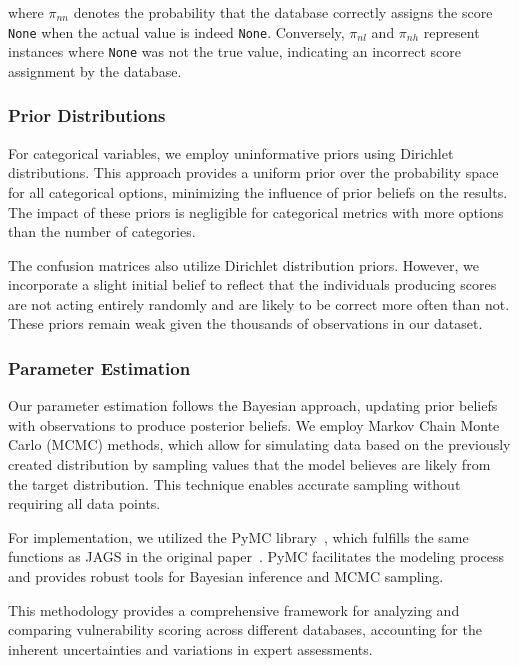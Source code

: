 \documentclass[12pt]{article}
\begin{document}
where $\pi_{nn}$ denotes the probability that the database correctly assigns the score \texttt{None}
when the actual value is indeed \texttt{None}. Conversely, $\pi_{nl}$ and $\pi_{nh}$ represent
instances where \texttt{None} was not the true value, indicating an incorrect score assignment by
the database.

\subsubsection{Prior Distributions}

For categorical variables, we employ uninformative priors using Dirichlet distributions. This
approach provides a uniform prior over the probability space for all categorical options, minimizing
the influence of prior beliefs on the results. The impact of these priors is negligible for
categorical metrics with more options than the number of categories.

The confusion matrices also utilize Dirichlet distribution priors. However, we incorporate a slight
initial belief to reflect that the individuals producing scores are not acting entirely randomly and
are likely to be correct more often than not. These priors remain weak given the thousands of
observations in our dataset.

\subsubsection{Parameter Estimation}

Our parameter estimation follows the Bayesian approach, updating prior beliefs with observations to
produce posterior beliefs. We employ Markov Chain Monte Carlo (MCMC) methods, which allow for
simulating data based on the previously created distribution by sampling values that the model
believes are likely from the target distribution. This technique enables accurate sampling without
requiring all data points.

For implementation, we utilized the PyMC library~\cite{pymc}, which fulfills the same functions as
JAGS in the original paper~\cite{bayes}. PyMC facilitates the modeling process and provides robust
tools for Bayesian inference and MCMC sampling.

This methodology provides a comprehensive framework for analyzing and comparing vulnerability
scoring across different databases, accounting for the inherent uncertainties and variations in
expert assessments.

\end{document}
